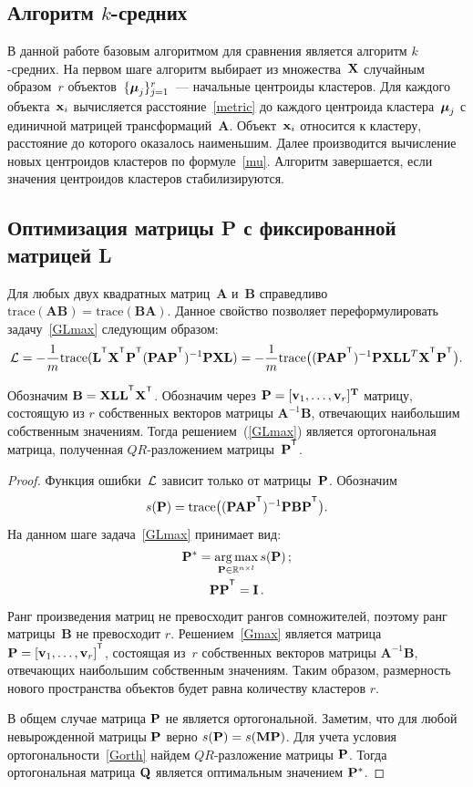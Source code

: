 \subsection*{Алгоритм $k$-средних}
В данной работе базовым алгоритмом для сравнения является алгоритм $k$-средних.
На первом шаге алгоритм выбирает из множества~$\mathbf{X}$ случайным образом~$r$ объектов~$\{\boldsymbol{\mu}_j\}_{j=1}^r$~--- начальные центроиды кластеров.
Для каждого объекта~$\mathbf{x}_i$ вычисляется расстояние~\eqref{metric} до каждого центроида кластера~$\boldsymbol{\mu}_j$ с единичной матрицей трансформаций~$\mathbf{A}$.
Объект~$\mathbf{x}_i$ относится к кластеру, расстояние до которого оказалось наименьшим.
Далее производится вычисление новых центроидов кластеров по формуле~\eqref{mu}.
Алгоритм завершается, если значения центроидов кластеров стабилизируются.

\subsection*{Оптимизация матрицы P с фиксированной матрицей L}
Для любых двух квадратных матриц~$\mathbf{A}$ и~$\mathbf{B}$ справедливо $\text{trace}(\mathbf{AB}) = \text{trace}(\mathbf{BA})$.
Данное свойство позволяет переформулировать задачу~\eqref{GLmax} следующим образом:
\[
\cL = -\frac{1}{m} \text{trace} (\mathbf{L}^{\T} \bX^{\T} \bP^{\T} (\bP \mathbf{A} \bP^{\T})^{-1} \bP \bX \mathbf{L}) = -\frac{1}{m} \text{trace} \bigl((\bP \mathbf{A} \bP^{\T})^{-1} \bP \bX \mathbf{LL}^{T} \bX^{\T} \bP^{\T}\bigr).
\]
\begin{theorem}
	Обозначим $\mathbf{B} = \bX \mathbf{LL}^{\T} \bX^{\T}$.
	Обозначим через $\mathbf{P} = [\mathbf{v}_1, \ldots, \mathbf{v}_r]^{\mathbf{T}}$ матрицу, состоящую из $r$ собственных векторов матрицы $\mathbf{A}^{-1}\mathbf{B}$, отвечающих наибольшим собственным значениям.
	Тогда решением~(\ref{GLmax}) является ортогональная матрица, полученная $QR$-разложением матрицы~$\bP^{\T}$.
\end{theorem}
\begin{proof}
Функция ошибки~$\mathcal{L}$ зависит только от матрицы~$\mathbf{P}$. Обозначим
\[
s(\bP) = \text{trace} \bigl((\bP \mathbf{A} \bP^{\T})^{-1} \bP \mathbf{B} \bP^{\T}\bigr).
\]
На данном шаге задача~\eqref{GLmax} принимает вид:
\begin{gather}
\label{Gmax}
\bP^* = \argmax_{\bP \in \bbR^{n \times l}} s(\bP)\,; \\
\label{Gorth}
\bP \bP^{\T} = \mathbf{I}\,.
\end{gather}
Ранг произведения матриц не превосходит рангов сомножителей, поэтому ранг матрицы~$\mathbf{B}$ не превосходит $r$.
Решением~\eqref{Gmax} является матрица $\bP = [\mathbf{v}_1, \ldots, \mathbf{v}_r]^{\T}$, состоящая
из~$r$ собственных векторов матрицы $\mathbf{A}^{-1}\mathbf{B}$, отвечающих наибольшим собственным значениям.
Таким образом, размерность нового пространства объектов будет равна количеству кластеров $r$.

В общем случае матрица $\mathbf{P}$ не является ортогональной.
Заметим, что для любой невырожденной матрицы $\mathbf{P}$ верно $s(\mathbf{P}) = s(\mathbf{M} \mathbf{P})$.
Для учета условия ортогональности~\eqref{Gorth} найдем $QR$-разложение матрицы $\mathbf{P}$.
Тогда ортогональная матрица $\mathbf{Q}$ является оптимальным значением $\mathbf{P}^*$.
\end{proof}

